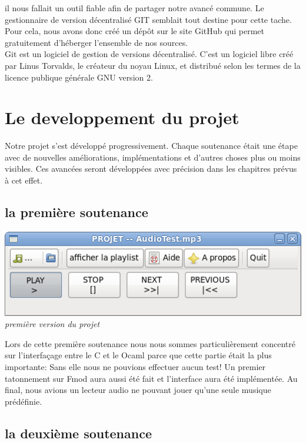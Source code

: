 \documentclass[12pt,a4paper]{report}
\begin{document}
il nous fallait un outil fiable afin de partager notre avancé commune. Le gestionnaire de version décentralisé GIT semblait tout destine pour cette tache. Pour cela, nous avons donc créé un dépôt sur le site GitHub qui permet gratuitement d'héberger l'ensemble de nos sources.\\
Git est un logiciel de gestion de versions décentralisé. C'est un logiciel libre créé par Linus Torvalds, le créateur du noyau Linux, et distribué selon les termes de la licence publique générale GNU version 2.


\chapter{Le developpement du projet}
Notre projet s'est développé progressivement. Chaque soutenance était une étape avec de nouvelles améliorations, implémentations et d'autres choses plus ou moins visibles. 
Ces avancées seront développées avec précision dans les chapitres prévus à cet effet.

\section{la première soutenance}

\begin{center}
\includegraphics[scale = 0.8]{interface1.png}
\it{ première version du projet}

\end{center}
Lors de cette première soutenance nous nous sommes particulièrement concentré sur l'interfaçage entre le C et le Ocaml parce que cette partie était la plus importante:
Sans elle nous ne pouvions effectuer aucun test! 
Un premier tatonnement sur Fmod aura aussi été fait et l'interface aura été implémentée. 
Au final, nous avions un lecteur audio ne pouvant jouer qu'une seule musique prédéfinie.

\section{la deuxième soutenance}
\end{document}
